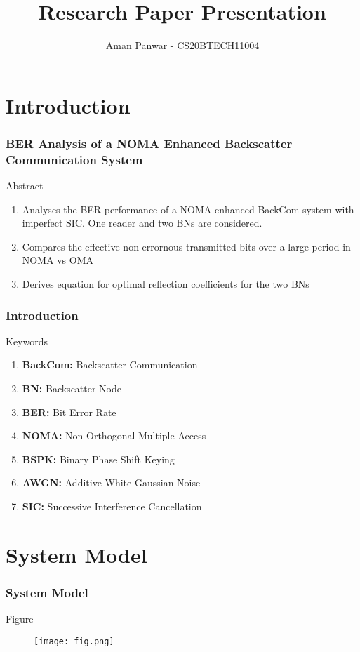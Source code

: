 \documentclass{beamer}
\title{Research Paper Presentation}
\author{Aman Panwar - CS20BTECH11004}
\theoremstyle{remark}
\numberwithin{equation}{subsection}
\begin{document}
\begin{frame}
\titlepage
\end{frame}


\section{Introduction}

\begin{frame}
\frametitle{BER Analysis of a NOMA Enhanced Backscatter Communication System}
\begin{block}{Abstract}
    \begin{enumerate}
        \item Analyses the BER performance of a NOMA enhanced BackCom system with imperfect SIC. One reader and two BNs are considered.
        \item Compares the effective non-errornous transmitted bits over a large period in NOMA vs OMA
        \item Derives equation for optimal reflection coefficients for the two BNs
    \end{enumerate}
\end{block}
\end{frame}

\begin{frame}
\frametitle{Introduction}
\begin{block}{Keywords}
    \begin{enumerate}
        \item \textbf{BackCom: } Backscatter Communication
        \item \textbf{BN: } Backscatter Node
        \item \textbf{BER: } Bit Error Rate
        \item \textbf{NOMA: } Non-Orthogonal Multiple Access
        \item \textbf{BSPK: } Binary Phase Shift Keying
        \item \textbf{AWGN: } Additive White Gaussian Noise
        \item \textbf{SIC: } Successive Interference Cancellation
    \end{enumerate}
\end{block}
\end{frame}


\section{System Model}

\begin{frame}
\frametitle{System Model}
\begin{block}{Figure}
    \begin{figure}
    \centering
    \texttt{[image: fig.png]}
    \label{fig:my_label}
\end{figure}
\end{block}
\end{frame}
\end{document}
